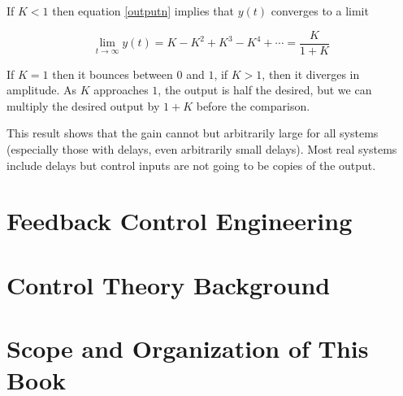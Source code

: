 \documentclass[10pt]{article}
\begin{document}
If $K < 1$ then equation \ref{outputn} implies that $y(t)$ converges to a limit 

\begin{equation}
    \lim_{t \rightarrow \infty} y(t) = K - K^2 + K^3 - K^4 + \cdots = \frac{K}{1 + K}
\end{equation}

\noindent If $K = 1$ then it bounces between $0$ and $1$, if $K>1$, then it diverges in amplitude. As $K$ approaches $1$, the output is half the desired, but we can multiply the desired output by $1+K$ before the comparison. 

This result shows that the gain cannot but arbitrarily large for all systems (especially those with delays, even arbitrarily small delays). Most real systems include delays but control inputs are not going to be copies of the output. 









\section{Feedback Control Engineering}

\section{Control Theory Background}

\section{Scope and Organization of This Book}

\end{document}
